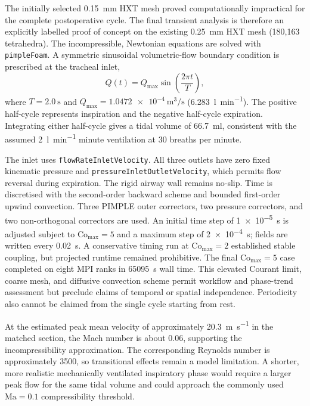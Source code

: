 \documentclass[11pt,a4paper]{article}
\begin{document}
The initially selected \num{0.15}~mm HXT mesh proved computationally
impractical for the complete postoperative cycle. The final transient analysis
is therefore an explicitly labelled proof of concept on the existing
\num{0.25}~mm HXT mesh (180,163 tetrahedra). The incompressible, Newtonian
equations are solved with \texttt{pimpleFoam}. A symmetric sinusoidal volumetric-flow boundary condition is
prescribed at the tracheal inlet,
\begin{equation}
  Q(t)=Q_{\max}\sin\left(\frac{2\pi t}{T}\right),
\end{equation}
where $T=\SI{2.0}{\second}$ and
$Q_{\max}=\SI{1.0472e-4}{\metre\cubed\per\second}$
(\SI{6.283}{\litre\per\minute}). The positive half-cycle represents inspiration
and the negative half-cycle expiration. Integrating either half-cycle gives a
tidal volume of \SI{66.7}{\milli\litre}, consistent with the assumed
\SI{2}{\litre\per\minute} minute ventilation at 30 breaths per minute.

The inlet uses \texttt{flowRateInletVelocity}. All three outlets have zero fixed
kinematic pressure and \texttt{pressureInletOutletVelocity}, which permits flow
reversal during expiration. The rigid airway wall remains no-slip. Time is
discretised with the second-order backward scheme and bounded first-order upwind
convection. Three PIMPLE outer correctors, two pressure correctors, and two
non-orthogonal correctors are used. An initial time step of
\SI{1e-5}{\second} is adjusted subject to $\mathrm{Co}_{\max}=5$ and a maximum
step of \SI{2e-4}{\second}; fields are written every \SI{0.02}{\second}. A
conservative timing run at $\mathrm{Co}_{\max}=2$ established stable coupling,
but projected runtime remained prohibitive. The final $\mathrm{Co}_{\max}=5$
case completed on eight MPI ranks in \SI{65095}{\second} wall time. This elevated
Courant limit, coarse mesh, and diffusive convection scheme permit workflow and
phase-trend assessment but preclude claims of temporal or spatial independence.
Periodicity also cannot be claimed from the single cycle starting from rest.

At the estimated peak mean velocity of approximately
\SI{20.3}{\metre\per\second} in the matched section, the Mach number is about
0.06, supporting the incompressibility approximation. The corresponding Reynolds
number is approximately 3500, so transitional effects remain a model limitation.
A shorter, more realistic mechanically ventilated inspiratory phase would require
a larger peak flow for the same tidal volume and could approach the commonly used
$\mathrm{Ma}=0.1$ compressibility threshold.
\end{document}
